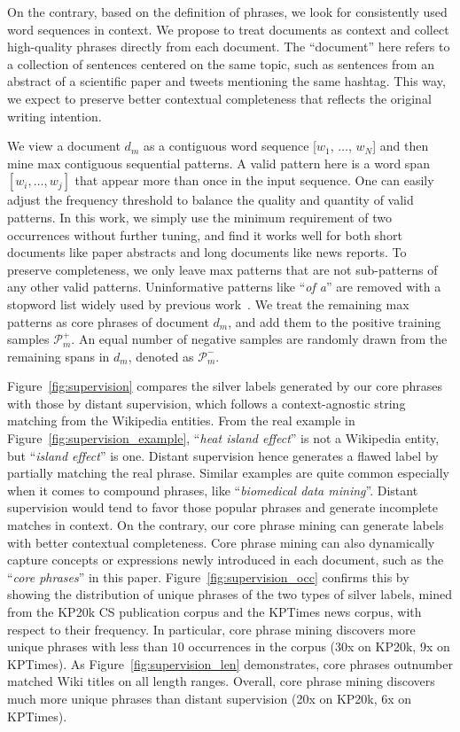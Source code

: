 \documentclass[sigconf]{acmart}
\newcommand{\example}[1]{``\emph{#1}''}
\begin{document}
On the contrary, based on the definition of phrases, we look for consistently used word sequences in context.
We propose to treat documents as context and collect high-quality phrases directly from each document.
The ``document'' here refers to a collection of sentences centered on the same topic, such as sentences from an abstract of a scientific paper and tweets mentioning the same hashtag. 
This way, we expect to preserve better contextual completeness that reflects the original writing intention.

We view a document $d_m$ as a contiguous word sequence [$w_1$, $\ldots$, $w_N$] and then mine max contiguous sequential patterns.
A valid pattern here is a word span $[w_i, \ldots, w_j]$ that appear more than once in the input sequence.
One can easily adjust the frequency threshold to balance the quality and quantity of valid patterns.
In this work, we simply use the minimum requirement of two occurrences without further tuning, and find it works well for both short documents like paper abstracts and long documents like news reports. 
To preserve completeness, we only leave max patterns that are not sub-patterns of any other valid patterns.
Uninformative patterns like \example{of a} are removed with a stopword list widely used by previous work~\cite{liu2015mining,shang2018automated}.
We treat the remaining max patterns as core phrases of document $d_m$, and add them to the positive training samples $\mathcal{P}_m^+$.
An equal number of negative samples are randomly drawn from the remaining spans in $d_m$, denoted as $\mathcal{P}_m^-$.

Figure~\ref{fig:supervision} compares the silver labels generated by our core phrases with those by distant supervision, which follows a context-agnostic string matching from the Wikipedia entities.
From the real example in Figure~\ref{fig:supervision_example}, \example{heat island effect} is not a Wikipedia entity, but \example{island effect} is one.
Distant supervision hence generates a flawed label by partially matching the real phrase.
Similar examples are quite common especially when it comes to compound phrases, like \example{biomedical data mining}.
Distant supervision would tend to favor those popular phrases and generate incomplete matches in context.
On the contrary, our core phrase mining can generate labels with better contextual completeness. 
Core phrase mining can also dynamically capture concepts or expressions newly introduced in each document, such as the \example{core phrases} in this paper. 
 Figure~\ref{fig:supervision_occ} confirms this by showing the distribution of unique phrases of the two types of silver labels, mined from the KP20k CS publication corpus and the KPTimes news corpus, with respect to their frequency.
In particular, core phrase mining discovers more unique phrases with less than $10$ occurrences in the corpus (30x on KP20k, 9x on KPTimes).
As Figure~\ref{fig:supervision_len} demonstrates, core phrases outnumber matched Wiki titles on all length ranges.
Overall, core phrase mining discovers much more unique phrases than distant supervision (20x on KP20k, 6x on KPTimes).
\end{document}
